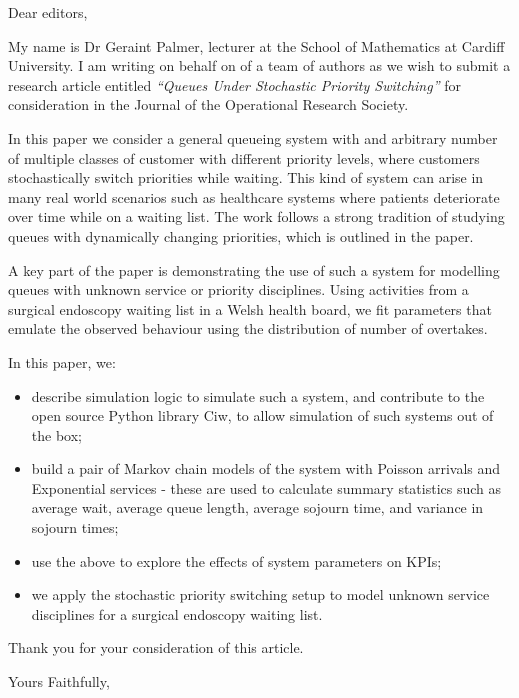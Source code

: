 \documentclass{letter}
\begin{document}
\begin{letter}{}
\opening{Dear editors,}

My name is Dr Geraint Palmer, lecturer at the School of Mathematics at Cardiff University. I am writing on behalf on of a team of authors as we wish to submit a research article entitled \textit{``Queues Under Stochastic Priority Switching''} for consideration in the Journal of the Operational Research Society.

In this paper we consider a general queueing system with and arbitrary number of multiple classes of customer with different priority levels, where customers stochastically switch priorities while waiting. This kind of system can arise in many real world scenarios such as healthcare systems where patients deteriorate over time while on a waiting list. The work follows a strong tradition of studying queues with dynamically changing priorities, which is outlined in the paper.

A key part of the paper is demonstrating the use of such a system for modelling queues with unknown service or priority disciplines. Using activities from a surgical endoscopy waiting list in a Welsh health board, we fit parameters that emulate the observed behaviour using the distribution of number of overtakes.

In this paper, we:

\begin{itemize}
  \item describe simulation logic to simulate such a system, and contribute to the open source Python library Ciw, to allow simulation of such systems out of the box;
  \item build a pair of Markov chain models of the system with Poisson arrivals and Exponential services - these are used to calculate summary statistics such as average wait, average queue length, average sojourn time, and variance in sojourn times;
  \item use the above to explore the effects of system parameters on KPIs;
  \item we apply the stochastic priority switching setup to model unknown service disciplines for a surgical endoscopy waiting list.
\end{itemize}

Thank you for your consideration of this article.

\closing{Yours Faithfully,}

\end{letter}
\end{document}
